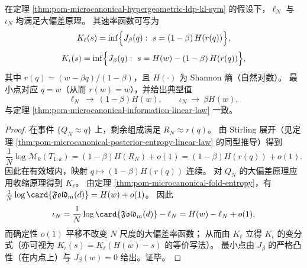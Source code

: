 \begin{theorem}\label{thm:pom-microcanonical-moduli-information-ldp}
在定理 \ref{thm:pom-microcanonical-hypergeometric-ldp-kl-sym} 的假设下，\(\ell_N\) 与 \(\iota_N\) 均满足大偏差原理。
其速率函数可写为
\[
K_\ell(s)=\inf\Bigl\{J_\beta(q):\ s=(1-\beta)\,H(r(q))\Bigr\},
\]
\[
K_\iota(s)=\inf\Bigl\{J_\beta(q):\ s=H(w)-(1-\beta)\,H(r(q))\Bigr\},
\]
其中 \(r(q)=(w-\beta q)/(1-\beta)\)，且 \(H(\cdot)\) 为 Shannon 熵（自然对数）。
最小点对应 \(q=w\)（从而 \(r(w)=w\)），并给出典型值
\[
\ell_N\ \to\ (1-\beta)H(w),
\qquad
\iota_N\ \to\ \beta H(w),
\]
与定理 \ref{thm:pom-microcanonical-information-linear-law} 一致。
\end{theorem}
\begin{proof}
在事件 \(\{Q_N\approx q\}\) 上，剩余组成满足 \(R_N\approx r(q)\)。
由 Stirling 展开（见定理 \ref{thm:pom-microcanonical-posterior-entropy-linear-law} 的同型推导）得到
\[
\frac{1}{N}\log\mathcal{M}_k(T_{1:k})
=(1-\beta)H(R_N)+o(1)
=(1-\beta)H(r(q))+o(1).
\]
因此在有效域内，映射 \(q\mapsto (1-\beta)H(r(q))\) 连续。
对 \(Q_N\) 的大偏差原理应用收缩原理得到 \(K_\ell\)。
由定理 \ref{thm:pom-microcanonical-fold-entropy}，有 \(\frac{1}{N}\log\card{\mathfrak{Fold}_m(d)}=H(w)+o(1)\)。
因此
\[
\iota_N=\frac{1}{N}\log\card{\mathfrak{Fold}_m(d)}-\ell_N
=H(w)-\ell_N+o(1),
\]
而确定性 \(o(1)\) 平移不改变 \(N\) 尺度的大偏差率函数；
从而由 \(K_\ell\) 立得 \(K_\iota\) 的变分式（亦可视为 \(K_\iota(s)=K_\ell(H(w)-s)\) 的等价写法）。
最小点由 \(J_\beta\) 的严格凸性（在内点上）与 \(J_\beta(w)=0\) 给出。证毕。
\end{proof}

